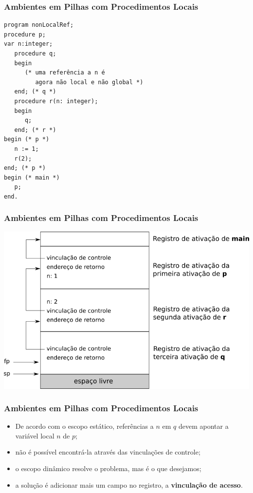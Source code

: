 \documentclass[table]{beamer}
\begin{document}
\begin{frame}[fragile]
   \frametitle{Ambientes em Pilhas com Procedimentos Locais}
   \footnotesize
   \begin{verbatim}
program nonLocalRef;
procedure p;
var n:integer;
   procedure q;
   begin
      (* uma referência a n é 
         agora não local e não global *)
   end; (* q *)
   procedure r(n: integer);
   begin
      q;
   end; (* r *)
begin (* p *)
   n := 1;
   r(2);
end; (* p *)
begin (* main *)
   p;
end.
   \end{verbatim}
\end{frame}

\begin{frame}
   \frametitle{Ambientes em Pilhas com Procedimentos Locais}
   \includegraphics[width=\linewidth,height=\textheight,keepaspectratio]{figuras/procedimentoslocais01.png}
\end{frame}

\begin{frame}
   \frametitle{Ambientes em Pilhas com Procedimentos Locais}
   \begin{itemize}
      \item De acordo com o escopo estático, referências a $n$ em $q$ devem apontar a variável local $n$ de $p$;
      \item não é possível encontrá-la através das vinculações de controle;
      \item o escopo dinâmico resolve o problema, mas é o que desejamos;
      \item a solução é adicionar mais um campo no registro, a \textbf{vinculação de acesso}.
   \end{itemize}
\end{frame}
\end{document}
